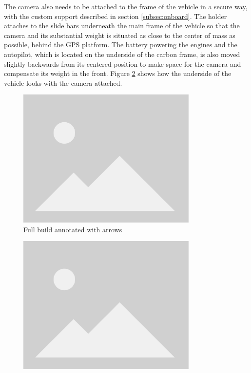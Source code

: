 The camera also needs to be attached to the frame of the vehicle in a secure way, with the custom support described in section \ref{subsec:onboard}.
The holder attaches to the slide bars underneath the main frame of the vehicle so that the camera and its substantial weight is situated as close to the center of mass as possible, behind the GPS platform.
The battery powering the engines and the autopilot, which is located on the underside of the carbon frame, is also moved slightly backwards from its centered position to make space for the camera and compensate its weight in the front.
Figure \ref{fig:camera-holder-closeup} shows how the underside of the vehicle looks with the camera attached.

\begin{figure}
  \centering
  \includegraphics[width=0.8\textwidth, keepaspectratio]{img/placeholder.png}
  \caption{Full build annotated with arrows}\label{fig:full-build}
\end{figure}

\begin{figure}
  \centering
  \includegraphics[width=0.8\textwidth, keepaspectratio]{img/placeholder.png}
  \caption{}\label{fig:camera-holder-closeup}
\end{figure}


